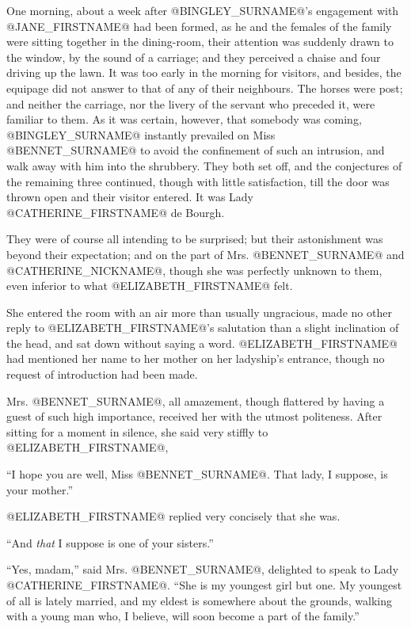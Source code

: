 One morning, about a week after @BINGLEY_SURNAME@'s engagement with @JANE_FIRSTNAME@ had been
formed, as he and the females of the family were sitting together in the
dining-room, their attention was suddenly drawn to the window, by the
sound of a carriage; and they perceived a chaise and four driving up
the lawn. It was too early in the morning for visitors, and besides, the
equipage did not answer to that of any of their neighbours. The horses
were post; and neither the carriage, nor the livery of the servant who
preceded it, were familiar to them. As it was certain, however, that
somebody was coming, @BINGLEY_SURNAME@ instantly prevailed on Miss @BENNET_SURNAME@ to avoid
the confinement of such an intrusion, and walk away with him into the
shrubbery. They both set off, and the conjectures of the remaining three
continued, though with little satisfaction, till the door was thrown
open and their visitor entered. It was Lady @CATHERINE_FIRSTNAME@ de Bourgh.

They were of course all intending to be surprised; but their
astonishment was beyond their expectation; and on the part of Mrs.
@BENNET_SURNAME@ and @CATHERINE_NICKNAME@, though she was perfectly unknown to them, even
inferior to what @ELIZABETH_FIRSTNAME@ felt.

She entered the room with an air more than usually ungracious, made no
other reply to @ELIZABETH_FIRSTNAME@'s salutation than a slight inclination of the
head, and sat down without saying a word. @ELIZABETH_FIRSTNAME@ had mentioned her
name to her mother on her ladyship's entrance, though no request of
introduction had been made.

Mrs. @BENNET_SURNAME@, all amazement, though flattered by having a guest of such
high importance, received her with the utmost politeness. After sitting
for a moment in silence, she said very stiffly to @ELIZABETH_FIRSTNAME@,

``I hope you are well, Miss @BENNET_SURNAME@. That lady, I suppose, is your
mother.''

@ELIZABETH_FIRSTNAME@ replied very concisely that she was.

``And \textit{that} I suppose is one of your sisters.''

``Yes, madam,'' said Mrs. @BENNET_SURNAME@, delighted to speak to Lady @CATHERINE_FIRSTNAME@.
``She is my youngest girl but one. My youngest of all is lately married,
and my eldest is somewhere about the grounds, walking with a young man
who, I believe, will soon become a part of the family.''

